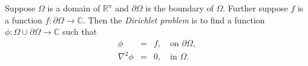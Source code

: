 \documentclass[12pt]{article}
\newcommand{\sR}[0]{\mathbb{R}}
\newcommand{\sC}[0]{\mathbb{C}}
\begin{document}
Suppose $\Omega$ is a domain of $\sR^n$ and $\partial\Omega$ is the boundary of $\Omega$. 
Further suppose $f$ is a function $f\colon\partial \Omega\to\sC$. Then the 
\emph{Dirichlet problem} is to find a function $\phi\colon \Omega\cup \partial \Omega \to\sC$
such that 
\begin{eqnarray*}
\phi &=& f,\quad \text{on $\partial \Omega$}, \\
\nabla^2 \phi &=& 0,\quad \text{in $\Omega$}. 
\end{eqnarray*}
\end{document}

